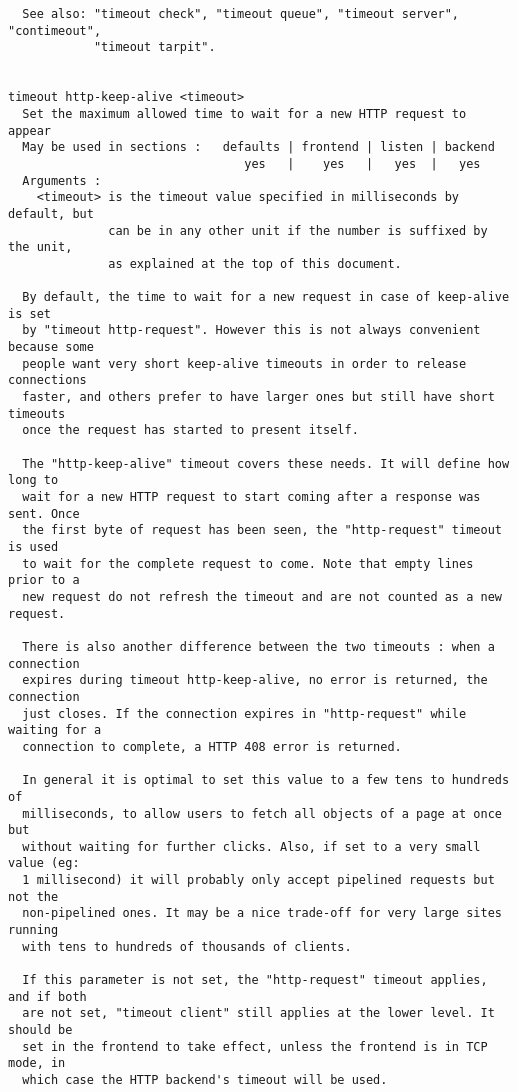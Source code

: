 \begin{verbatim}
  See also: "timeout check", "timeout queue", "timeout server", "contimeout",
            "timeout tarpit".


timeout http-keep-alive <timeout>
  Set the maximum allowed time to wait for a new HTTP request to appear
  May be used in sections :   defaults | frontend | listen | backend
                                 yes   |    yes   |   yes  |   yes
  Arguments :
    <timeout> is the timeout value specified in milliseconds by default, but
              can be in any other unit if the number is suffixed by the unit,
              as explained at the top of this document.

  By default, the time to wait for a new request in case of keep-alive is set
  by "timeout http-request". However this is not always convenient because some
  people want very short keep-alive timeouts in order to release connections
  faster, and others prefer to have larger ones but still have short timeouts
  once the request has started to present itself.

  The "http-keep-alive" timeout covers these needs. It will define how long to
  wait for a new HTTP request to start coming after a response was sent. Once
  the first byte of request has been seen, the "http-request" timeout is used
  to wait for the complete request to come. Note that empty lines prior to a
  new request do not refresh the timeout and are not counted as a new request.

  There is also another difference between the two timeouts : when a connection
  expires during timeout http-keep-alive, no error is returned, the connection
  just closes. If the connection expires in "http-request" while waiting for a
  connection to complete, a HTTP 408 error is returned.

  In general it is optimal to set this value to a few tens to hundreds of
  milliseconds, to allow users to fetch all objects of a page at once but
  without waiting for further clicks. Also, if set to a very small value (eg:
  1 millisecond) it will probably only accept pipelined requests but not the
  non-pipelined ones. It may be a nice trade-off for very large sites running
  with tens to hundreds of thousands of clients.

  If this parameter is not set, the "http-request" timeout applies, and if both
  are not set, "timeout client" still applies at the lower level. It should be
  set in the frontend to take effect, unless the frontend is in TCP mode, in
  which case the HTTP backend's timeout will be used.


\end{verbatim}
